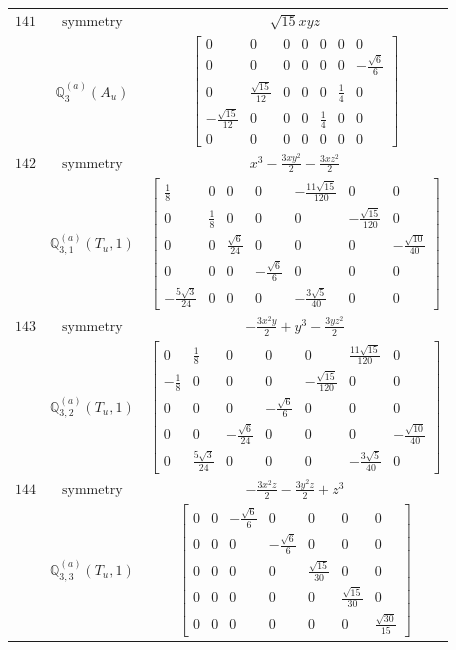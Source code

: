 \documentclass[fleqn,8pt,landscape]{jsarticle}
\begin{document}
\begin{longtable}{ccc}
$ 141 $ & $ \text{symmetry} $ & $ \sqrt{15} x y z $ \\
$  $ & $ \mathbb{Q}_{3}^{(a)}(A_{u}) $ & $ \begin{bmatrix} 0 & 0 & 0 & 0 & 0 & 0 & 0 \\ 0 & 0 & 0 & 0 & 0 & 0 & - \frac{\sqrt{6}}{6} \\ 0 & \frac{\sqrt{15}}{12} & 0 & 0 & 0 & \frac{1}{4} & 0 \\ - \frac{\sqrt{15}}{12} & 0 & 0 & 0 & \frac{1}{4} & 0 & 0 \\ 0 & 0 & 0 & 0 & 0 & 0 & 0 \end{bmatrix} $ \\ \hline
$ 142 $ & $ \text{symmetry} $ & $ x^{3} - \frac{3 x y^{2}}{2} - \frac{3 x z^{2}}{2} $ \\
$  $ & $ \mathbb{Q}_{3,1}^{(a)}(T_{u},1) $ & $ \begin{bmatrix} \frac{1}{8} & 0 & 0 & 0 & - \frac{11 \sqrt{15}}{120} & 0 & 0 \\ 0 & \frac{1}{8} & 0 & 0 & 0 & - \frac{\sqrt{15}}{120} & 0 \\ 0 & 0 & \frac{\sqrt{6}}{24} & 0 & 0 & 0 & - \frac{\sqrt{10}}{40} \\ 0 & 0 & 0 & - \frac{\sqrt{6}}{6} & 0 & 0 & 0 \\ - \frac{5 \sqrt{3}}{24} & 0 & 0 & 0 & - \frac{3 \sqrt{5}}{40} & 0 & 0 \end{bmatrix} $ \\ \hline
$ 143 $ & $ \text{symmetry} $ & $ - \frac{3 x^{2} y}{2} + y^{3} - \frac{3 y z^{2}}{2} $ \\
$  $ & $ \mathbb{Q}_{3,2}^{(a)}(T_{u},1) $ & $ \begin{bmatrix} 0 & \frac{1}{8} & 0 & 0 & 0 & \frac{11 \sqrt{15}}{120} & 0 \\ - \frac{1}{8} & 0 & 0 & 0 & - \frac{\sqrt{15}}{120} & 0 & 0 \\ 0 & 0 & 0 & - \frac{\sqrt{6}}{6} & 0 & 0 & 0 \\ 0 & 0 & - \frac{\sqrt{6}}{24} & 0 & 0 & 0 & - \frac{\sqrt{10}}{40} \\ 0 & \frac{5 \sqrt{3}}{24} & 0 & 0 & 0 & - \frac{3 \sqrt{5}}{40} & 0 \end{bmatrix} $ \\ \hline
$ 144 $ & $ \text{symmetry} $ & $ - \frac{3 x^{2} z}{2} - \frac{3 y^{2} z}{2} + z^{3} $ \\
$  $ & $ \mathbb{Q}_{3,3}^{(a)}(T_{u},1) $ & $ \begin{bmatrix} 0 & 0 & - \frac{\sqrt{6}}{6} & 0 & 0 & 0 & 0 \\ 0 & 0 & 0 & - \frac{\sqrt{6}}{6} & 0 & 0 & 0 \\ 0 & 0 & 0 & 0 & \frac{\sqrt{15}}{30} & 0 & 0 \\ 0 & 0 & 0 & 0 & 0 & \frac{\sqrt{15}}{30} & 0 \\ 0 & 0 & 0 & 0 & 0 & 0 & \frac{\sqrt{30}}{15} \end{bmatrix} $ \\ \hline

\end{longtable}
\end{document}
